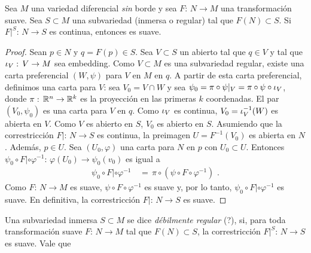 \begin{teoCorrestringirElCodominio}%
	\label{thm:correstringirelcodominio}
	Sea $M$ una variedad diferencial \emph{sin} borde y sea
	$F:\,N\rightarrow M$ una transformaci\'{o}n suave. Sea $S\subset M$
	una subvariedad (inmersa o regular) tal que $F(N)\subset S$.
	Si $F|^{S}:\,N\rightarrow S$ es continua, entonces es suave.
\end{teoCorrestringirElCodominio}

\begin{proof}
	Sean $p\in N$ y $q=F(p)\in S$. Sea $V\subset S$ un abierto tal que
	$q\in V$ y tal que $\inc[V]:\,V\rightarrow M$ sea embedding. Como
	$V\subset M$ es una subvariedad regular, existe una carta preferencial
	$(W,\psi)$ para $V$ en $M$ en $q$. A partir de esta carta preferencial,
	definimos una carta para $V$: sea $V_{0}=V\cap W$ y sea
	$\psi_{0}=\pi\circ\psi|_{V}=\pi\circ\psi\circ\inc[V]$, donde
	$\pi:\,\bb{R}^{n}\rightarrow\bb{R}^{k}$ es la proyecci\'{o}n en
	las primeras $k$ coordenadas. El par $(V_{0},\psi_{0})$ es una
	carta para $V$ en $q$. Como $\inc[V]$ es continua,
	$V_{0}=\inc[V]^{-1}(W)$ es abierta en $V$. Como $V$ es abierto en $S$,
	$V_{0}$ es abierto en $S$. Asumiendo que la correstricci\'{o}n
	$F|:\,N\rightarrow S$ es continua, la preimagen $U=F^{-1}(V_{0})$ es
	abierta en $N$. Adem\'{a}s, $p\in U$. Sea $(U_{0},\varphi)$ una
	carta para $N$ en $p$ con $U_{0}\subset U$. Entonces
	$\psi_{0}\circ F|\circ\varphi^{-1}:%
	\,\varphi(U_{0})\rightarrow\psi_{0}(v_{0})$ es igual a
	\begin{align*}
		\psi_{0}\circ F|\circ\varphi^{-1} & \,=\,
			\pi\circ (\psi\circ F\circ\varphi^{-1})
		\text{ .}
	\end{align*}
	Como $F:\,N\rightarrow M$ es suave, $\psi\circ F\circ\varphi^{-1}$ es
	suave y, por lo tanto, $\psi_{0}\circ F|\circ\varphi^{-1}$ es suave.
	En definitiva, la correstricci\'{o}n $F|:\,N\rightarrow S$ es suave.
\end{proof}

Una subvariedad inmersa $S\subset M$ se dice \emph{d\'{e}bilmente regular}
(?), si, para toda transformaci\'{o}n suave $F:\,N\rightarrow M$ tal que
$F(N)\subset S$, la correstricci\'{o}n $F|^{S}:\,N\rightarrow S$ es suave.
Vale que

